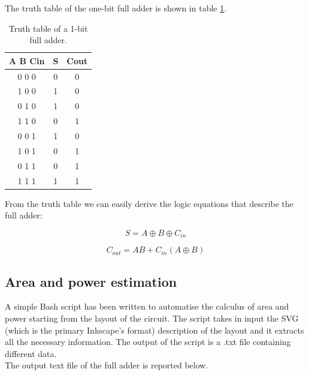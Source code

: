 The truth table of the one-bit full adder is shown in table \ref{tab:1}. %


	\begin{table}[ht]
	\centering
	\begin{tabular}{ccc}
	\toprule
	A B Cin & S & Cout\\
	\midrule
	0 0 0 & 0 & 0\\
	1 0 0 & 1 & 0\\
	0 1 0 & 1 & 0\\
	1 1 0 & 0 & 1\\
	0 0 1 & 1 & 0\\
	1 0 1 & 0 & 1\\
	0 1 1 & 0 & 1\\
	1 1 1 & 1 & 1\\
	\bottomrule
	\end{tabular}
	\caption{Truth table of a 1-bit full adder.}
	\label{tab:1} %
	\end{table}
	
From the truth table we can easily derive the logic equations that describe the full adder:


	\begin{equation}
	S = A \oplus B \oplus C_{in}
	\label{eq:1}
	\end{equation}

	\begin{equation}
	C_{out} = AB + C_{in}( A \oplus B)
	\label{eq:2}
	\end{equation}
	
\subsection{Area and power estimation}

A simple Bash script has been written to automatise the calculus of area and power starting from the layout of the circuit. The script takes in input the SVG (which is the primary Inkscape's format) description of the layout and it extracts all the necessary information. The output of the script is a .txt file containing different data.\\
The output text file of the full adder is reported below.

